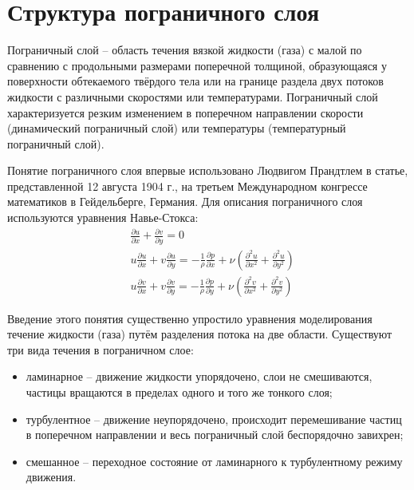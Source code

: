 \section{Структура пограничного слоя}
	Пограничный слой -- область течения вязкой жидкости (газа) с малой по сравнению с продольными размерами поперечной толщиной, образующаяся у поверхности обтекаемого твёрдого тела или на границе раздела двух потоков жидкости с различными скоростями или температурами. Пограничный слой характеризуется резким изменением в поперечном направлении скорости (динамический пограничный слой) или температуры (температурный пограничный слой).
	
	Понятие пограничного слоя впервые использовано Людвигом Прандтлем в статье, представленной 12 августа 1904 г., на третьем Международном конгрессе математиков в Гейдельберге, Германия. Для описания пограничного слоя используются уравнения Навье-Стокса:
	\begin{align}
		& \frac{\partial u}{\partial x} + \frac{\partial v}{\partial y} = 0 \nonumber\\
		& u\frac{\partial u}{\partial x} + v\frac{\partial u}{\partial y} = -\frac{1}{\rho}\frac{\partial p}{\partial x} + \nu(\frac{\partial^2 u}{\partial x^2} + \frac{\partial^2 u}{\partial y^2}) \nonumber\\
		& u\frac{\partial v}{\partial x} + v\frac{\partial v}{\partial y} = -\frac{1}{\rho}\frac{\partial p}{\partial y} + \nu(\frac{\partial^2 v}{\partial x^2} + \frac{\partial^2 v}{\partial y^2})
	\end{align}
	
	Введение этого понятия существенно упростило уравнения моделирования течение жидкости (газа) путём разделения потока на две области. Существуют три вида течения в пограничном слое:
	\begin{itemize}
		\item ламинарное -- движение жидкости упорядочено, слои не смешиваются, частицы вращаются в пределах одного и того же тонкого слоя;
		\item турбулентное -- движение неупорядочено, происходит перемешивание частиц в поперечном направлении и весь пограничный слой беспорядочно завихрен;
		\item смешанное -- переходное состояние от ламинарного к турбулентному режиму движения.
	\end{itemize}

